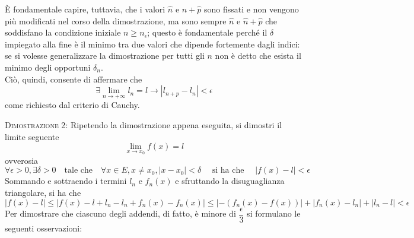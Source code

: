 \documentclass[a4paper]{extarticle}
\begin{document}
È fondamentale capire, tuttavia, che i valori $\hat n$ e $\hat n + \hat p$ sono fissati e non vengono più modificati nel corso della dimostrazione, ma sono sempre $\hat n$ e $\hat n + \hat p$ che soddisfano la condizione iniziale $n \geq n_\epsilon$; questo è fondamentale perché il $\delta$ impiegato alla fine è il minimo tra due valori che dipende fortemente dagli indici: se si volesse generalizzare la dimostrazione per tutti gli $n$ non è detto che esista il minimo degli opportuni $\delta_n$.\\
Ciò, quindi, consente di affermare che
\[\exists \lim_{n \to +\infty} l_n = l \rightarrow \left \vert l_{n+p} - l_n \right \vert < \epsilon\]
come richiesto dal criterio di Cauchy.

\newpage
\noindent
\normalfont \normalsize
\textsc{Dimostrazione 2}: Ripetendo la dimostrazione appena eseguita, si dimostri il limite seguente
\[\lim_{x \to x_0} f(x) = l\]
ovverosia
\[\forall \epsilon>0,\exists \delta > 0 \hspace{1em} \text{tale che} \hspace{1em} \forall x \in E, x \neq x_0, \left \vert x - x_0 \right \vert < \delta \hspace{1em} \text{ si ha che } \hspace{1em} \left \vert f(x) - l \right \vert < \epsilon\]
Sommando e sottraendo i termini $l_n$ e $f_n(x)$ e sfruttando la disuguaglianza triangolare, si ha che
\[\left \vert f(x) - l \right \vert \leq \left \vert f(x) - l + l_n - l_n + f_n(x) - f_n(x) \right \vert \leq \left \vert - \left(f_n(x) - f(x)\right) \right \vert + \left \vert f_n(x) - l_n \right \vert + \left \vert l_n - l \right \vert < \epsilon\]
Per dimostrare che ciascuno degli addendi, di fatto, è minore di $\dfrac{\epsilon}{3}$ si formulano le seguenti osservazioni:
\end{document}
